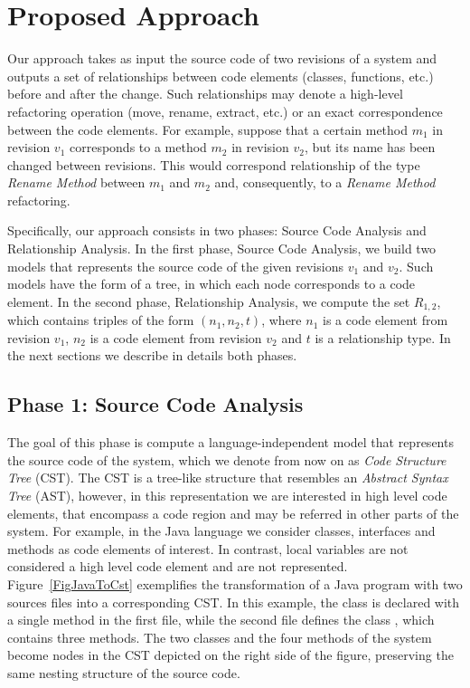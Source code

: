 \section{Proposed Approach}

Our approach takes as input the source code of two revisions of a system and outputs a set of relationships between code elements (classes, functions, etc.) before and after the change. Such relationships may denote a high-level refactoring operation (move, rename, extract, etc.) or an exact correspondence between the code elements.
For example, suppose that a certain method $m_1$ in revision $v_1$ corresponds to a method $m_2$ in revision $v_2$, but its name has been changed between revisions. 
This would correspond relationship of the type \emph{Rename Method} between $m_1$ and $m_2$ and, consequently, to a \emph{Rename Method} refactoring.

Specifically, our approach consists in two phases: Source Code Analysis and Relationship Analysis.
In the first phase, Source Code Analysis, we build two models that represents the source code of the given revisions $v_1$ and $v_2$.
Such models have the form of a tree, in which each node corresponds to a code element.
In the second phase, Relationship Analysis, we compute the set $R_{1,2}$, which contains triples of the form $(n_1, n_2, t)$, where $n_1$ is a code element from revision $v_1$, $n_2$ is a code element from revision $v_2$ and $t$ is a relationship type.
In the next sections we describe in details both phases.



\subsection{Phase 1: Source Code Analysis}

The goal of this phase is compute a language-independent model that represents the source code of the system, which we denote from now on as \emph{Code Structure Tree} (CST). The CST is a tree-like structure that resembles an \emph{Abstract Syntax Tree} (AST), however, in this representation we are interested in high level code elements, that encompass a code region and may be referred in other parts of the system. 
For example, in the Java language we consider classes, interfaces and methods as code elements of interest. In contrast, local variables are not considered a high level code element and are not represented. Figure~\ref{FigJavaToCst} exemplifies the transformation of a Java program with two sources files into a corresponding CST.
In this example, the class  is declared with a single method in the first file, while the second file defines the class , which contains three methods.
The two classes and the four methods of the system become nodes in the CST depicted on the right side of the figure, preserving the same nesting structure of the source code.


